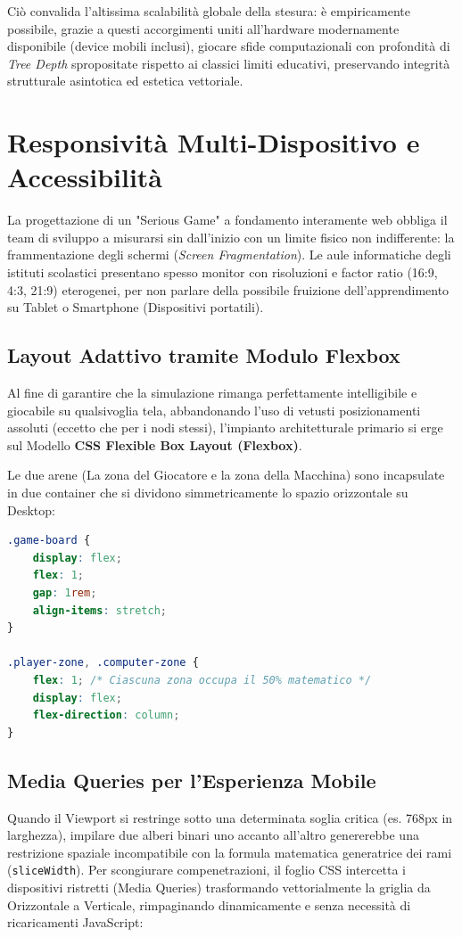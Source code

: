 \documentclass[openany]{theme/uniprthesis}
\begin{document}
Ciò convalida l'altissima scalabilità globale della stesura: è empiricamente possibile, grazie a questi accorgimenti uniti all'hardware modernamente disponibile (device mobili inclusi), giocare sfide computazionali con profondità di \textit{Tree Depth} spropositate rispetto ai classici limiti educativi, preservando integrità strutturale asintotica ed estetica vettoriale.

\section{Responsività Multi-Dispositivo e Accessibilità}
La progettazione di un "Serious Game" a fondamento interamente web obbliga il team di sviluppo a misurarsi sin dall'inizio con un limite fisico non indifferente: la frammentazione degli schermi (\textit{Screen Fragmentation}). Le aule informatiche degli istituti scolastici presentano spesso monitor con risoluzioni e factor ratio (16:9, 4:3, 21:9) eterogenei, per non parlare della possibile fruizione dell'apprendimento su Tablet o Smartphone (Dispositivi portatili).

\subsection{Layout Adattivo tramite Modulo Flexbox}
Al fine di garantire che la simulazione rimanga perfettamente intelligibile e giocabile su qualsivoglia tela, abbandonando l'uso di vetusti posizionamenti assoluti (eccetto che per i nodi stessi), l'impianto architetturale primario si erge sul Modello \textbf{CSS Flexible Box Layout (Flexbox)}.

Le due arene (La zona del Giocatore e la zona della Macchina) sono incapsulate in due container che si dividono simmetricamente lo spazio orizzontale su Desktop:
\begin{lstlisting}[language=CSS, breaklines=true, basicstyle=\footnotesize\ttfamily, frame=single, caption={Divisione simmetrica desktop delle aree di gioco}, keywordstyle=\color{blue}]
.game-board {
    display: flex;
    flex: 1;
    gap: 1rem;
    align-items: stretch;
}

.player-zone, .computer-zone {
    flex: 1; /* Ciascuna zona occupa il 50% matematico */
    display: flex;
    flex-direction: column;
}
\end{lstlisting}

\subsection{Media Queries per l'Esperienza Mobile}
Quando il Viewport si restringe sotto una determinata soglia critica (es. 768px in larghezza), impilare due alberi binari uno accanto all'altro genererebbe una restrizione spaziale incompatibile con la formula matematica generatrice dei rami (\texttt{sliceWidth}). Per scongiurare compenetrazioni, il foglio CSS intercetta i dispositivi ristretti (Media Queries) trasformando vettorialmente la griglia da Orizzontale a Verticale, rimpaginando dinamicamente e senza necessità di ricaricamenti JavaScript:
\end{document}
